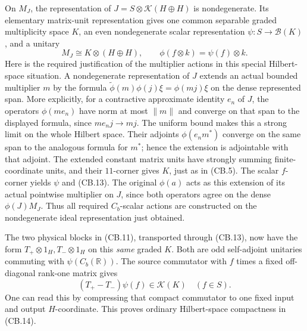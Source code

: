 \documentclass[
  11pt,
]{article}
\begin{document}
On \(M_J\), the representation of \(J=S\otimes\mathcal K(H\oplus H)\) is
nondegenerate. Its elementary matrix-unit representation gives one
common separable graded multiplicity space \(K\), an even nondegenerate
scalar representation \(\psi:S\to\mathcal B(K)\), and a unitary \[
 M_J\cong K\otimes(H\oplus H),\qquad
 \phi(f\otimes k)=\psi(f)\otimes k.
 \tag{CB.13}
\] Here is the required justification of the multiplier actions in this
special Hilbert-space situation. A nondegenerate representation of \(J\)
extends an actual bounded multiplier \(m\) by the formula
\(\widetilde\phi(m)\phi(j)\xi=\phi(mj)\xi\) on the dense represented
span. More explicitly, for a contractive approximate identity \(e_n\) of
\(J\), the operators \(\phi(me_n)\) have norm at most \(\|m\|\) and
converge on that span to the displayed formula, since \(me_nj\to mj\).
The uniform bound makes this a strong limit on the whole Hilbert space.
Their adjoints \(\phi(e_nm^*)\) converge on the same span to the
analogous formula for \(m^*\); hence the extension is adjointable with
that adjoint. The extended constant matrix units have strongly summing
finite-coordinate units, and their \(11\)-corner gives \(K\), just as in
(CB.5). The scalar \(f\)-corner yields \(\psi\) and (CB.13). The
original \(\phi(a)\) acts as this extension of its actual pointwise
multiplier on \(J\), since both operators agree on the dense
\(\phi(J)M_J\). Thus all required \(C_b\)-scalar actions are constructed
on the nondegenerate ideal representation just obtained.

The two physical blocks in (CB.11), transported through (CB.13), now
have the form \(T_+\otimes1_H,T_-\otimes1_H\) on this \emph{same} graded
\(K\). Both are odd self-adjoint unitaries commuting with
\(\psi(C_b(\mathbb R))\). The source commutator with \(f\) times a fixed
off-diagonal rank-one matrix gives \[
 (T_+-T_-)\psi(f)\in\mathcal K(K)
 \quad(f\in S).
 \tag{CB.14}
\] One can read this by compressing that compact commutator to one fixed
input and output \(H\)-coordinate. This proves ordinary Hilbert-space
compactness in (CB.14).
\end{document}
